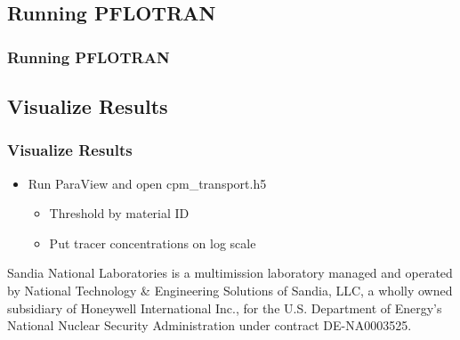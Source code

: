 \documentclass{beamer}
\begin{document}
\subsection{Running PFLOTRAN}

\begin{frame}[fragile]\frametitle{Running PFLOTRAN}


\end{frame}

\subsection{Visualize Results}

\begin{frame}[fragile]\frametitle{Visualize Results}
	
	\begin{itemize}
		\item Run ParaView and open cpm\_transport.h5 
		\begin{itemize}
			\item Threshold by material ID
			\item Put tracer concentrations on log scale
		\end{itemize}
	\end{itemize}
\end{frame}

\begin{frame}[fragile]
	
		Sandia National Laboratories is a multimission laboratory managed and operated by National Technology \& Engineering Solutions of Sandia, LLC, a wholly owned subsidiary of Honeywell International Inc., for the U.S. Department of Energy’s National Nuclear Security Administration under contract DE-NA0003525.
		
\end{frame}
\end{document}
